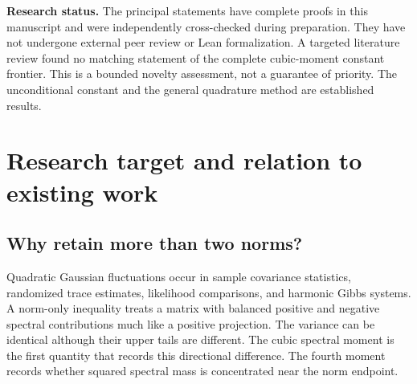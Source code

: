 \documentclass[11pt,letterpaper]{article}
\numberwithin{equation}{section}
\theoremstyle{definition}\newtheorem{definition}[theorem]{Definition}
\theoremstyle{remark}\newtheorem{remark}[theorem]{Remark}
\newcommand{\tr}{\operatorname{tr}}
\begin{document}
\begin{titlepage}
\begin{abstract}
The proof retains the signed cubic spectral moment through a convex
spectral-kernel envelope. A second refinement uses $\tr A^4$ and a
two-node Gauss--Radau rule. We give its exact moment-extremal property,
closed-form Chernoff optimizer, equality cases, and nonnegative remainder.
An unequal harmonic-mode contrast attains this envelope and has exactly
computable rational tail probabilities, including a sharp asymptotic
equivalent and its first correction. Gaussian trace estimates and
diagonal-free subgaussian forms inherit the bounds; triangle-free random
cuts provide a combinatorial application. The accompanying code reproduces
the figures, exact certificates, symbolic identities, and numerical audits.
Classical concentration and quadrature ingredients are explicitly credited;
the claimed contribution is the moment-dependent sharpening and its
optimality analysis.
\end{abstract}
\vfill
\begin{tcolorbox}[colback=pale,colframe=accent,boxrule=.5pt]
\small\textbf{Research status.} The principal statements have complete
proofs in this manuscript and were independently cross-checked during
preparation. They have not undergone external peer review or Lean
formalization. A targeted literature review found no matching statement
of the complete cubic-moment constant frontier. This is a bounded novelty
assessment, not a guarantee of priority. The unconditional constant and
the general quadrature method are established results.
\end{tcolorbox}
\end{titlepage}
\tableofcontents
\newpage

\section{Research target and relation to existing work}

\subsection{Why retain more than two norms?}
Quadratic Gaussian fluctuations occur in sample covariance statistics,
randomized trace estimates, likelihood comparisons, and harmonic Gibbs
systems. A norm-only inequality treats a matrix with balanced positive
and negative spectral contributions much like a positive projection.
The variance can be identical although their upper tails are different.
The cubic spectral moment is the first quantity that records this
directional difference. The fourth moment records whether squared
spectral mass is concentrated near the norm endpoint.
\end{document}
